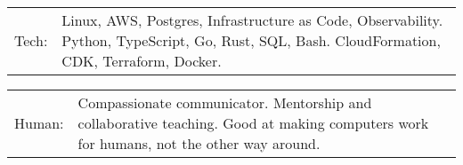 \documentclass[10pt,a4paper]{article}
\newcommand{\tzlarrow}{(0,0) -- (0.2,0) -- (0.3,0.2) -- (0.2,0.4) -- (0,0.4) -- (0.1,0.2) -- cycle;}
\newcommand{\larrow}[1]
{\begin{tikzpicture}[scale=0.58]
	 \filldraw[fill=#1!100,draw=#1!100!black]  \tzlarrow
 \end{tikzpicture}
}
\newcommand{\metasection}[2]
{
\begin{tabular*}{1\textwidth}{p{2.4cm} p{14cm}}
\larrow{bgcol}	\normalsize{\textcolor{sectcol}{#1}}&#2\\[12pt]
\end{tabular*}
}
\begin{document}
\pagestyle{fancy}	


\vspace{-20.55pt}


\hspace{-0.25\linewidth}\colorbox{bgcol}{}



\vspace{12pt}

\metasection{Tech:}{Linux, AWS, Postgres, Infrastructure as Code, Observability. Python, TypeScript, Go, Rust, SQL, Bash. CloudFormation, CDK, Terraform, Docker.}
\metasection{Human:}{Compassionate communicator. Mentorship and collaborative teaching. Good at making computers work for humans, not the other way around.}

\vspace{6pt}

\end{document}
